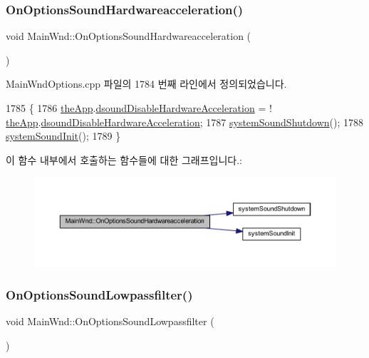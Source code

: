 \subsubsection{\texorpdfstring{On\+Options\+Sound\+Hardwareacceleration()}{OnOptionsSoundHardwareacceleration()}}
{\footnotesize\ttfamily void Main\+Wnd\+::\+On\+Options\+Sound\+Hardwareacceleration (\begin{DoxyParamCaption}{ }\end{DoxyParamCaption})}



Main\+Wnd\+Options.\+cpp 파일의 1784 번째 라인에서 정의되었습니다.


\begin{DoxyCode}
1785 \{
1786   \mbox{\hyperlink{_v_b_a_8cpp_a8095a9d06b37a7efe3723f3218ad8fb3}{theApp}}.\mbox{\hyperlink{class_v_b_a_a58f89c52283d10a0fcaac8abb7eca524}{dsoundDisableHardwareAcceleration}} = !
      \mbox{\hyperlink{_v_b_a_8cpp_a8095a9d06b37a7efe3723f3218ad8fb3}{theApp}}.\mbox{\hyperlink{class_v_b_a_a58f89c52283d10a0fcaac8abb7eca524}{dsoundDisableHardwareAcceleration}};
1787   \mbox{\hyperlink{system_8cpp_ada306cd4177ec7d296668534b0c377d0}{systemSoundShutdown}}();
1788   \mbox{\hyperlink{system_8cpp_a46a394ba020dc0fc499bb8481c21325b}{systemSoundInit}}();
1789 \}
\end{DoxyCode}
이 함수 내부에서 호출하는 함수들에 대한 그래프입니다.\+:
\nopagebreak
\begin{figure}[H]
\begin{center}
\leavevmode
\includegraphics[width=350pt]{class_main_wnd_a8adfcf00230b2bf44aa4a077bcdb6a0e_cgraph}
\end{center}
\end{figure}
\mbox{\label{class_main_wnd_ae0615da70b0d8ad601287b6d78f3d100}} 
\subsubsection{\texorpdfstring{On\+Options\+Sound\+Lowpassfilter()}{OnOptionsSoundLowpassfilter()}}
{\footnotesize\ttfamily void Main\+Wnd\+::\+On\+Options\+Sound\+Lowpassfilter (\begin{DoxyParamCaption}{ }\end{DoxyParamCaption})\hspace{0.3cm}{\ttfamily [protected]}}



